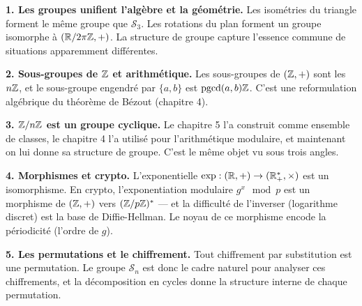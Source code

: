 \begin{intuitionbox}
\textbf{1. Les groupes unifient l'algèbre et la géométrie.} Les isométries du triangle forment le même groupe que $\mathcal{S}_3$. Les rotations du plan forment un groupe isomorphe à $(\mathbb{R}/2\pi\mathbb{Z}, +)$. La structure de groupe capture l'essence commune de situations apparemment différentes.

\textbf{2. Sous-groupes de $\mathbb{Z}$ et arithmétique.} Les sous-groupes de $(\mathbb{Z}, +)$ sont les $n\mathbb{Z}$, et le sous-groupe engendré par $\{a, b\}$ est $\mathrm{pgcd}(a,b)\mathbb{Z}$. C'est une reformulation algébrique du théorème de Bézout (chapitre 4).

\textbf{3. $\mathbb{Z}/n\mathbb{Z}$ est un groupe cyclique.} Le chapitre 5 l'a construit comme ensemble de classes, le chapitre 4 l'a utilisé pour l'arithmétique modulaire, et maintenant on lui donne sa structure de groupe. C'est le même objet vu sous trois angles.

\textbf{4. Morphismes et crypto.} L'exponentielle $\exp : (\mathbb{R}, +) \to (\mathbb{R}^*_+, \times)$ est un isomorphisme. En crypto, l'exponentiation modulaire $g^x \mod p$ est un morphisme de $(\mathbb{Z}, +)$ vers $(\mathbb{Z}/p\mathbb{Z})^*$ --- et la difficulté de l'inverser (logarithme discret) est la base de Diffie-Hellman. Le noyau de ce morphisme encode la périodicité (l'ordre de $g$).

\textbf{5. Les permutations et le chiffrement.} Tout chiffrement par substitution est une permutation. Le groupe $\mathcal{S}_n$ est donc le cadre naturel pour analyser ces chiffrements, et la décomposition en cycles donne la structure interne de chaque permutation.
\end{intuitionbox}


